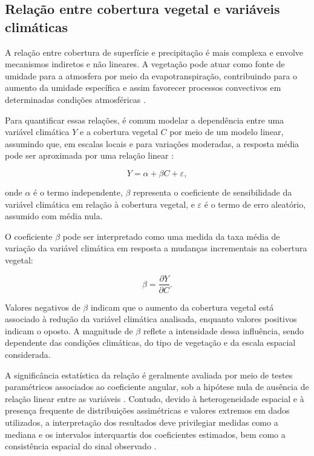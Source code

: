 \subsection{Relação entre cobertura vegetal e variáveis climáticas}
\label{subsec:teoria_cobertura_clima}

A relação entre cobertura de superfície e precipitação é mais complexa e envolve mecanismos indiretos e não lineares. A vegetação pode atuar como fonte de umidade para a atmosfera por meio da evapotranspiração, contribuindo para o aumento da umidade específica e assim favorecer processos convectivos em determinadas condições atmosféricas \citep{eagleson1978}.

Para quantificar essas relações, é comum modelar a dependência entre uma variável climática $Y$ e a cobertura vegetal $C$ por meio de um modelo linear, assumindo que, em escalas locais e para variações moderadas, a resposta média pode ser aproximada por uma relação linear \citep{wilks2011}:

\begin{equation}
	Y = \alpha + \beta C + \varepsilon,
	\label{eq:reg_cobertura_teorica}
\end{equation}

\noindent onde $\alpha$ é o termo independente, $\beta$ representa o coeficiente de sensibilidade da variável climática em relação à cobertura vegetal, e $\varepsilon$ é o termo de erro aleatório, assumido com média nula.

O coeficiente $\beta$ pode ser interpretado como uma medida da taxa média de variação da variável climática em resposta a mudanças incrementais na cobertura vegetal:

\begin{equation}
	\beta = \frac{\partial Y}{\partial C}.
\end{equation}

Valores negativos de $\beta$ indicam que o aumento da cobertura vegetal está associado à redução da variável climática analisada, enquanto valores positivos indicam o oposto. A magnitude de $\beta$ reflete a intensidade dessa influência, sendo dependente das condições climáticas, do tipo de vegetação e da escala espacial considerada.

A significância estatística da relação é geralmente avaliada por meio de testes paramétricos associados ao coeficiente angular, sob a hipótese nula de ausência de relação linear entre as variáveis \citep{wilks2011}. Contudo, devido à heterogeneidade espacial e à presença frequente de distribuições assimétricas e valores extremos em dados utilizados, a interpretação dos resultados deve privilegiar medidas como a mediana e os intervalos interquartis dos coeficientes estimados, bem como a consistência espacial do sinal observado \citep{cressie1993}.

